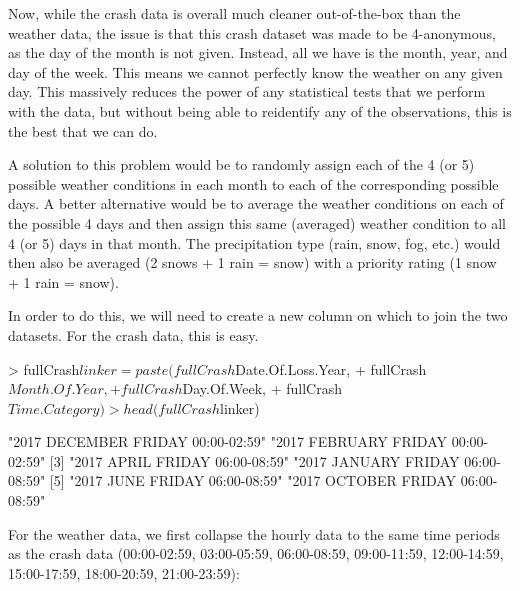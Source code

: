 \documentclass[11pt, a4paper]{article}
\begin{document}
Now, while the crash data is overall much cleaner out-of-the-box than the weather data, the issue is that this crash dataset was made to be 4-anonymous, as the day of the month is not given. Instead, all we have is the month, year, and day of the week. This means we cannot perfectly know the weather on any given day. This massively reduces the power of any statistical tests that we perform with the data, but without being able to reidentify any of the observations, this is the best that we can do. 
\par
A solution to this problem would be to randomly assign each of the 4 (or 5) possible weather conditions in each month to each of the corresponding possible days. A better alternative would be to average the weather conditions on each of the possible 4 days and then assign this same (averaged) weather condition to all 4 (or 5) days in that month. The precipitation type (rain, snow, fog, etc.) would then also be averaged (2 snows + 1 rain = snow) with a priority rating (1 snow + 1 rain = snow). 
\par
In order to do this, we will need to create a new column on which to join the two datasets. For the crash data, this is easy. 

\begin{Schunk}
\begin{Sinput}
> fullCrash$linker = paste(fullCrash$Date.Of.Loss.Year,
+                          fullCrash$Month.Of.Year, 
+                          fullCrash$Day.Of.Week,
+                          fullCrash$Time.Category)
> head(fullCrash$linker)
\end{Sinput}
\begin{Soutput}
[1] "2017 DECEMBER FRIDAY 00:00-02:59" "2017 FEBRUARY FRIDAY 00:00-02:59"
[3] "2017 APRIL FRIDAY 06:00-08:59"    "2017 JANUARY FRIDAY 06:00-08:59" 
[5] "2017 JUNE FRIDAY 06:00-08:59"     "2017 OCTOBER FRIDAY 06:00-08:59" 
\end{Soutput}
\end{Schunk}


For the weather data, we first collapse the hourly data to the same time periods as the crash data (00:00-02:59, 03:00-05:59, 06:00-08:59, 09:00-11:59, 12:00-14:59, 15:00-17:59, 18:00-20:59, 21:00-23:59):
\end{document}
